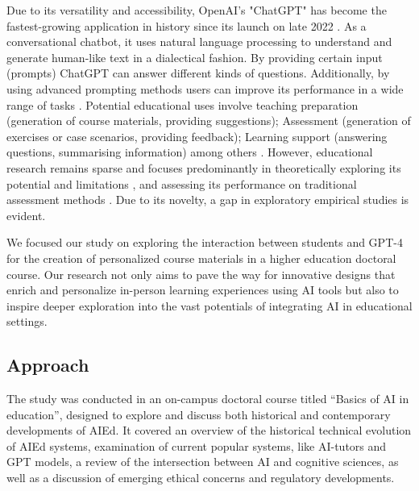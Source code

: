 \documentclass[sn-mathphys, Numbered]{sn-jnl}%
\theoremstyle{thmstyleone}%
\theoremstyle{thmstyletwo}%
\theoremstyle{thmstylethree}%
\begin{document}
Due to its versatility and accessibility, OpenAI's "ChatGPT" has become the fastest-growing application in history since its launch on late 2022 \parencite{milmo_chatgpt_2023}. As a conversational chatbot, it uses natural language processing to understand and generate human-like text in a dialectical fashion. By providing certain input (prompts) ChatGPT can answer different kinds of questions. Additionally, by using advanced prompting methods users can improve its performance in a wide range of tasks \parencite{wei_chain--thought_2023,fernando_promptbreeder_2023}. Potential educational uses involve teaching preparation (generation of course materials, providing suggestions); Assessment (generation of exercises or case scenarios, providing feedback); Learning support (answering questions, summarising information) among others \parencite{lo_what_2023,montenegro-rueda_impact_2023}.  However, educational research remains sparse and focuses predominantly in theoretically exploring its potential and limitations \parencite{qadir_engineering_2022,cain_gpteammate_2023}, and assessing its performance on traditional assessment methods \parencite{nisar_is_2023}. Due to its novelty, a gap in exploratory empirical studies is evident.

We focused our study on exploring the interaction between students and GPT-4 for the creation of personalized course materials in a higher education doctoral course. Our research not only aims to pave the way for innovative designs that enrich and personalize in-person learning experiences using AI tools but also to inspire deeper exploration into the vast potentials of integrating AI in educational settings. 




\subsection{Approach}\label{Approach}  


The study was conducted in an on-campus doctoral course titled “Basics of AI in education”, designed to explore and discuss both historical and contemporary developments of AIEd. It covered an overview of the historical technical evolution of AIEd systems, examination of current popular systems, like AI-tutors and GPT models, a review of the intersection between AI and cognitive sciences, as well as a discussion of emerging ethical concerns and regulatory developments. 
\end{document}
